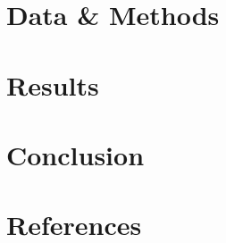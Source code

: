 \documentclass[
]{agujournal2019}
\begin{document}
\section{Data \& Methods}\label{sec-data-methods}

\section{Results}\label{results}

\section{Conclusion}\label{conclusion}

\section*{References}\label{references}
\end{document}
